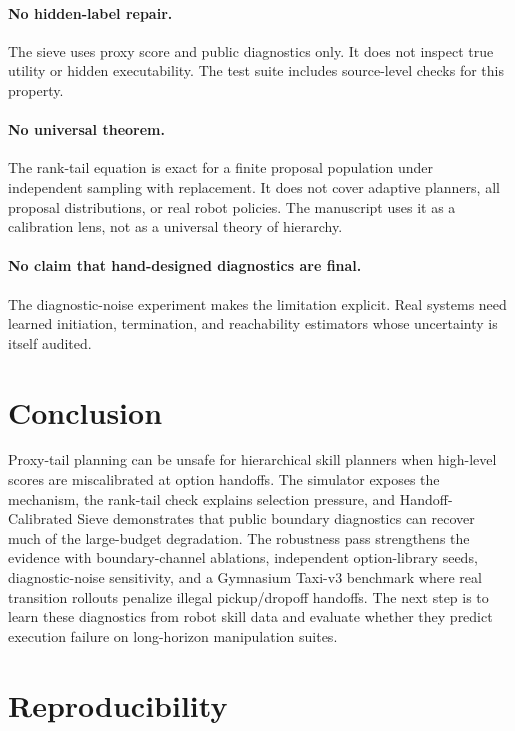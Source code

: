 \documentclass{article}
\begin{document}
\paragraph{No hidden-label repair.}
The sieve uses proxy score and public diagnostics only. It does not inspect true utility or hidden executability. The test suite includes source-level checks for this property.

\paragraph{No universal theorem.}
The rank-tail equation is exact for a finite proposal population under independent sampling with replacement. It does not cover adaptive planners, all proposal distributions, or real robot policies. The manuscript uses it as a calibration lens, not as a universal theory of hierarchy.

\paragraph{No claim that hand-designed diagnostics are final.}
The diagnostic-noise experiment makes the limitation explicit. Real systems need learned initiation, termination, and reachability estimators whose uncertainty is itself audited.

\section{Conclusion}

Proxy-tail planning can be unsafe for hierarchical skill planners when high-level scores are miscalibrated at option handoffs. The simulator exposes the mechanism, the rank-tail check explains selection pressure, and Handoff-Calibrated Sieve demonstrates that public boundary diagnostics can recover much of the large-budget degradation. The robustness pass strengthens the evidence with boundary-channel ablations, independent option-library seeds, diagnostic-noise sensitivity, and a Gymnasium Taxi-v3 benchmark where real transition rollouts penalize illegal pickup/dropoff handoffs. The next step is to learn these diagnostics from robot skill data and evaluate whether they predict execution failure on long-horizon manipulation suites.




\appendix

\section{Reproducibility}
\end{document}
